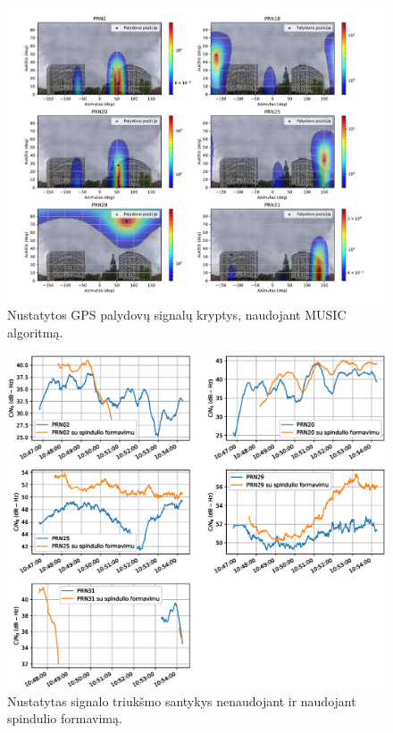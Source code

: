 \documentclass[main.tex]{subfiles}
\begin{document}
\begin{figure}[ht]
    \begin{centering}
    \includegraphics[scale=0.50]{drawings/two_reflections}
    \par\end{centering}
    \protect\caption{\label{fig:two_reflection}Nustatytos GPS palydovų signalų kryptys, naudojant MUSIC algoritmą.}
\end{figure}

\begin{figure}[ht]
    \begin{centering}
    \includegraphics[scale=0.6]{drawings/two_reflections_snr}
    \par\end{centering}
    \protect\caption{\label{fig:two_reflection_snr}Nustatytas signalo triukšmo santykys nenaudojant ir naudojant spindulio formavimą.}
\end{figure}
\end{document}
